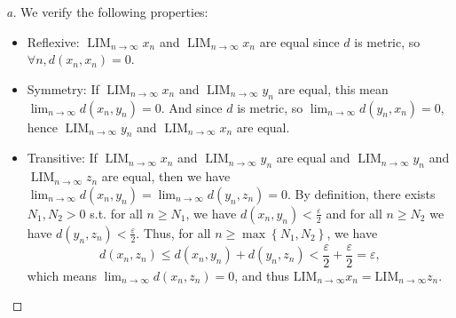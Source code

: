 \begin{proof}[a]
  We verify the following properties:
    \begin{itemize}
        \item Reflexive: $\operatorname{LIM}_{n\to\infty} x_n$ and $\operatorname{LIM}_{n\to\infty} x_n$ are equal since $d$ is metric, so $\forall n, d(x_n, x_n) = 0$.
        \item Symmetry: If $\operatorname{LIM}_{n\to\infty} x_n$ and $\operatorname{LIM}_{n\to\infty} y_n$ are equal, this mean $\lim_{n\to\infty} d(x_n,y_n) = 0$. And since $d$ is metric, so $\lim_{n\to\infty} d(y_n,x_n) = 0$, hence $\operatorname{LIM}_{n\to\infty} y_n$ and $\operatorname{LIM}_{n\to\infty} x_n$ are equal.
        \item Transitive: If $\operatorname{LIM}_{n\to\infty} x_n$ and $\operatorname{LIM}_{n\to\infty} y_n$ are equal and $\operatorname{LIM}_{n\to\infty} y_n$ and $\operatorname{LIM}_{n\to\infty} z_n$ are equal, then we have \(\lim_{n \to \infty} d(x_n, y_n) = \lim_{n \to \infty}  d(y_n, z_n) = 0  \). By definition, there exists \(N_1, N_2 > 0\) s.t. for all \(n \ge N_1\), we have \(d(x_n, y_n) < \frac{\varepsilon}{2}\) and for all \(n \ge N_2\) we have \(d(y_n, z_n) < \frac{\varepsilon}{2}\). Thus, for all \(n \ge \max \left\{ N_1, N_2 \right\} \), we have
        \[
            d(x_n, z_n) \le d(x_n, y_n) + d(y_n, z_n) < \frac{\varepsilon}{2} + \frac{\varepsilon}{2} = \varepsilon ,
        \] which means \(\lim_{n \to \infty} d(x_n, z_n) = 0 \), and thus \(\mathrm{LIM}_{n \to \infty} x_n = \mathrm{LIM}_{n \to \infty } z_n  \).  
    \end{itemize}
\end{proof}
